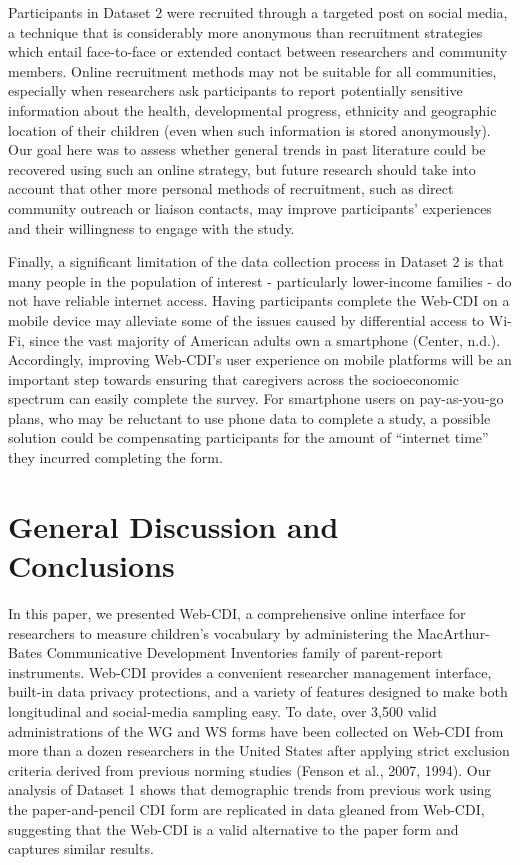 \documentclass[
  english,
  ,man,floatsintext]{apa6}
\begin{document}
Participants in Dataset 2 were recruited through a targeted post on social media, a technique that is considerably more anonymous than recruitment strategies which entail face-to-face or extended contact between researchers and community members. Online recruitment methods may not be suitable for all communities, especially when researchers ask participants to report potentially sensitive information about the health, developmental progress, ethnicity and geographic location of their children (even when such information is stored anonymously). Our goal here was to assess whether general trends in past literature could be recovered using such an online strategy, but future research should take into account that other more personal methods of recruitment, such as direct community outreach or liaison contacts, may improve participants' experiences and their willingness to engage with the study.

Finally, a significant limitation of the data collection process in Dataset 2 is that many people in the population of interest - particularly lower-income families - do not have reliable internet access. Having participants complete the Web-CDI on a mobile device may alleviate some of the issues caused by differential access to Wi-Fi, since the vast majority of American adults own a smartphone (Center, n.d.). Accordingly, improving Web-CDI's user experience on mobile platforms will be an important step towards ensuring that caregivers across the socioeconomic spectrum can easily complete the survey. For smartphone users on pay-as-you-go plans, who may be reluctant to use phone data to complete a study, a possible solution could be compensating participants for the amount of ``internet time'' they incurred completing the form.

\hypertarget{general-discussion-and-conclusions}{%
\section{General Discussion and Conclusions}\label{general-discussion-and-conclusions}}

In this paper, we presented Web-CDI, a comprehensive online interface for researchers to measure children's vocabulary by administering the MacArthur-Bates Communicative Development Inventories family of parent-report instruments. Web-CDI provides a convenient researcher management interface, built-in data privacy protections, and a variety of features designed to make both longitudinal and social-media sampling easy. To date, over 3,500 valid administrations of the WG and WS forms have been collected on Web-CDI from more than a dozen researchers in the United States after applying strict exclusion criteria derived from previous norming studies (Fenson et al., 2007, 1994). Our analysis of Dataset 1 shows that demographic trends from previous work using the paper-and-pencil CDI form are replicated in data gleaned from Web-CDI, suggesting that the Web-CDI is a valid alternative to the paper form and captures similar results.
\end{document}
